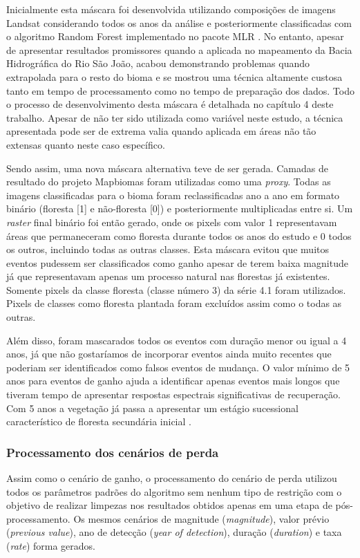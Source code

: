 Inicialmente esta máscara foi desenvolvida utilizando composições de imagens Landsat considerando todos os anos da análise e posteriormente classificadas com o algoritmo Random Forest implementado no pacote MLR \citep{mlr}. No entanto, apesar de apresentar resultados promissores quando a aplicada no mapeamento da Bacia Hidrográfica do Rio São João, acabou demonstrando problemas quando extrapolada para o resto do bioma e se mostrou uma técnica altamente custosa tanto em tempo de processamento como no tempo de preparação dos dados. Todo o processo de desenvolvimento desta máscara é detalhada no capítulo 4 deste trabalho. Apesar de não ter sido utilizada como variável neste estudo, a técnica apresentada pode ser de extrema valia quando aplicada em áreas não tão extensas quanto neste caso específico.

Sendo assim, uma nova máscara alternativa teve de ser gerada. Camadas de resultado do projeto Mapbiomas foram utilizadas como uma \textit{proxy}. Todas as imagens classificadas para o bioma foram reclassificadas ano a ano em formato binário (floresta [1] e não-floresta [0]) e posteriormente multiplicadas entre si. Um \textit{raster} final binário foi então gerado, onde os pixels com valor 1 representavam áreas que permaneceram como floresta durante todos os anos do estudo e 0 todos os outros, incluindo todas as outras classes. Esta máscara evitou que muitos eventos pudessem ser classificados como ganho apesar de terem baixa magnitude já que representavam apenas um processo natural nas florestas já existentes. Somente pixels da classe floresta (classe número 3) da série 4.1 foram utilizados. Pixels de classes como floresta plantada foram excluídos assim como o todas as outras.

Além disso, foram mascarados todos os eventos com duração menor ou igual a 4 anos, já que não gostaríamos de incorporar eventos ainda muito recentes que poderiam ser identificados como falsos eventos de mudança. O valor mínimo de 5 anos para eventos de ganho ajuda a identificar apenas eventos mais longos que tiveram tempo de apresentar respostas espectrais significativas de recuperação. Com 5 anos a vegetação já passa a apresentar um estágio sucessional característico de floresta secundária inicial \citep{Chazdon2014}. 

\subsubsection{Processamento dos cenários de perda}
\hspace{13pt} Assim como o cenário de ganho, o processamento do cenário de perda utilizou todos os parâmetros padrões do algoritmo sem nenhum tipo de restrição com o objetivo de realizar limpezas nos resultados obtidos apenas em uma etapa de pós-processamento. Os mesmos cenários de magnitude (\textit{magnitude}), valor prévio (\textit{previous value}), ano de detecção (\textit{year of detection}), duração (\textit{duration}) e taxa (\textit{rate}) forma gerados.

